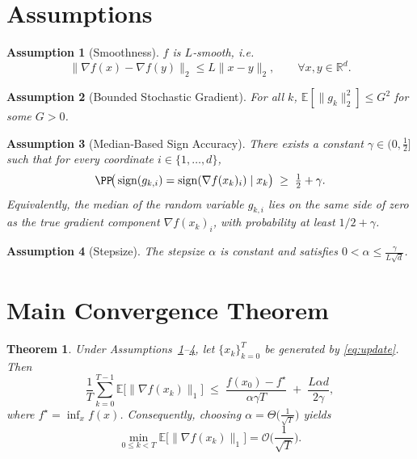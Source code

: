 \documentclass[11pt]{article}
\newtheorem{theorem}{Theorem}
\newtheorem{assumption}{Assumption}
\newcommand{\sign}{\operatorname{sign}}
\newcommand{\EE}{\mathbb{E}}
\newcommand{\RR}{\mathbb{R}}
\begin{document}
\newpage
\section*{Assumptions}
\begin{assumption}[Smoothness]\label{ass:smooth}
$f$ is $L$‑smooth, i.e.
\[
\|\nabla f(x)-\nabla f(y)\|_{2}\le L\|x-y\|_{2},\qquad\forall x,y\in\RR^{d}.
\]
\end{assumption}
\begin{assumption}[Bounded Stochastic Gradient]\label{ass:bounded}
For all $k$, $\EE[\|g_{k}\|_{2}^{2}]\le G^{2}$ for some $G>0$.
\end{assumption}
\begin{assumption}[Median‑Based Sign Accuracy]\label{ass:median}
There exists a constant $\gamma\in(0,\tfrac12]$ such that for every coordinate $i\in\{1,\dots,d\}$,
\[
\PP\!\big(\sign(g_{k,i})=\sign(\nabla f(x_{k})_{i})\mid x_{k}\big)\;\ge\;\tfrac12+\gamma .
\]
Equivalently, the median of the random variable $g_{k,i}$ lies on the same side of zero as the true gradient component $\nabla f(x_{k})_{i}$, with probability at least $1/2+\gamma$.
\end{assumption}
\begin{assumption}[Stepsize]\label{ass:stepsize}
The stepsize $\alpha$ is constant and satisfies $0<\alpha\le \frac{\gamma}{L\sqrt{d}}$.
\end{assumption}

\section*{Main Convergence Theorem}
\begin{theorem}\label{thm:main}
Under Assumptions~\ref{ass:smooth}–\ref{ass:stepsize}, let $\{x_{k}\}_{k=0}^{T}$ be generated by \eqref{eq:update}. Then
\[
\frac{1}{T}\sum_{k=0}^{T-1}\EE\!\big[\|\nabla f(x_{k})\|_{1}\big]
\;\le\;
\frac{f(x_{0})-f^{\star}}{\alpha\gamma T}
\;+\;
\frac{L\alpha d}{2\gamma},
\]
where $f^{\star}=\inf_{x}f(x)$. Consequently, choosing $\alpha=\Theta\big(\tfrac{1}{\sqrt{T}}\big)$ yields
\[
\min_{0\le k<T}\EE\!\big[\|\nabla f(x_{k})\|_{1}\big]=\mathcal O\!\Big(\frac{1}{\sqrt{T}}\Big).
\]
\end{theorem}
\end{document}
